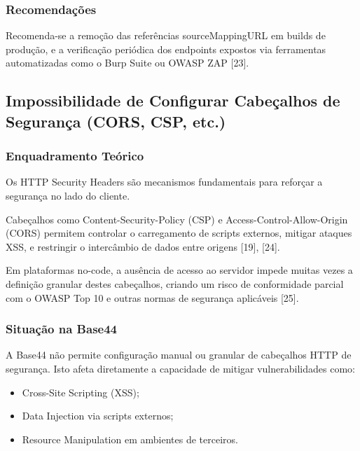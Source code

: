 \subsubsection{Recomendações}

Recomenda-se a remoção das referências sourceMappingURL em builds de produção, e a verificação periódica dos endpoints expostos via ferramentas automatizadas como o Burp Suite ou OWASP ZAP [23].

\subsection{Impossibilidade de Configurar Cabeçalhos de Segurança (CORS, CSP, etc.)}

\subsubsection{Enquadramento Teórico}

Os HTTP Security Headers são mecanismos fundamentais para reforçar a segurança no lado do cliente.

Cabeçalhos como Content-Security-Policy (CSP) e Access-Control-Allow-Origin (CORS) permitem controlar o carregamento de scripts externos, mitigar ataques XSS, e restringir o intercâmbio de dados entre origens [19], [24].

Em plataformas no-code, a ausência de acesso ao servidor impede muitas vezes a definição granular destes cabeçalhos, criando um risco de conformidade parcial com o OWASP Top 10 e outras normas de segurança aplicáveis [25].

\subsubsection{Situação na Base44}

A Base44 não permite configuração manual ou granular de cabeçalhos HTTP de segurança. Isto afeta diretamente a capacidade de mitigar vulnerabilidades como:

\begin{itemize}

\item Cross-Site Scripting (XSS);

\item Data Injection via scripts externos;

\item Resource Manipulation em ambientes de terceiros.

\end{itemize}

